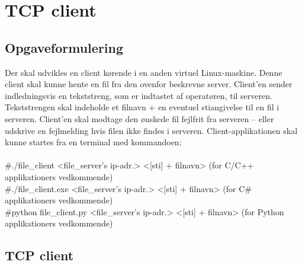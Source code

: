 \chapter{TCP client}

\section{Opgaveformulering}

Der skal udvikles en client kørende i en anden virtuel Linux-maskine. Denne client
skal kunne hente en fil fra den ovenfor beskrevne server. Client’en sender
indledningsvis en tekststreng, som er indtastet af operatøren, til serveren.
Tekststrengen skal indeholde et filnavn + en eventuel stiangivelse til en fil i serveren.
Client’en skal modtage den ønskede fil fejlfrit fra serveren – eller udskrive en
fejlmelding hvis filen ikke findes i serveren. Client-applikationen skal kunne startes fra
en terminal med kommandoen:\\ \\
\#./file\_client <file\_server’s ip-adr.> <[sti] + filnavn> (for C/C++ applikationers
vedkommende)\\
\#./file\_client.exe <file\_server’s ip-adr.> <[sti] + filnavn> (for C\# applikationers
vedkommende)\\ 
\#python file\_client.py <file\_server’s ip-adr.> <[sti] + filnavn> (for Python applikationers
vedkommende)\\

\section{TCP client}
